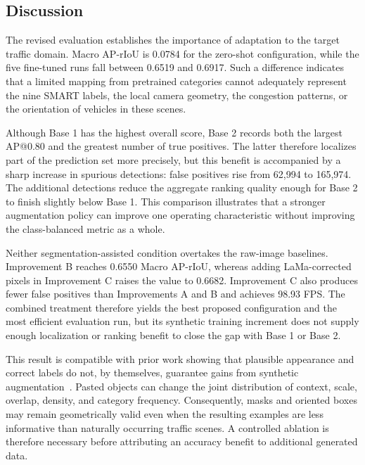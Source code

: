 \subsection{Discussion}
\label{sec:discussion}

The revised evaluation establishes the importance of adaptation to the target traffic domain. Macro AP-rIoU is 0.0784 for the zero-shot configuration, while the five fine-tuned runs fall between 0.6519 and 0.6917. Such a difference indicates that a limited mapping from pretrained categories cannot adequately represent the nine SMART labels, the local camera geometry, the congestion patterns, or the orientation of vehicles in these scenes.

Although Base 1 has the highest overall score, Base 2 records both the largest AP@0.80 and the greatest number of true positives. The latter therefore localizes part of the prediction set more precisely, but this benefit is accompanied by a sharp increase in spurious detections: false positives rise from 62,994 to 165,974. The additional detections reduce the aggregate ranking quality enough for Base 2 to finish slightly below Base 1. This comparison illustrates that a stronger augmentation policy can improve one operating characteristic without improving the class-balanced metric as a whole.

Neither segmentation-assisted condition overtakes the raw-image baselines. Improvement B reaches 0.6550 Macro AP-rIoU, whereas adding LaMa-corrected pixels in Improvement C raises the value to 0.6682. Improvement C also produces fewer false positives than Improvements A and B and achieves 98.93 FPS. The combined treatment therefore yields the best proposed configuration and the most efficient evaluation run, but its synthetic training increment does not supply enough localization or ranking benefit to close the gap with Base 1 or Base 2.

This result is compatible with prior work showing that plausible appearance and correct labels do not, by themselves, guarantee gains from synthetic augmentation~\cite{Weber2021ArtificialImagesVehicleDetection,Mumuni2024,HuangW2025,Alimisis2025Advances,Benkedadra2024,ZhuH2025}. Pasted objects can change the joint distribution of context, scale, overlap, density, and category frequency. Consequently, masks and oriented boxes may remain geometrically valid even when the resulting examples are less informative than naturally occurring traffic scenes. A controlled ablation is therefore necessary before attributing an accuracy benefit to additional generated data.

